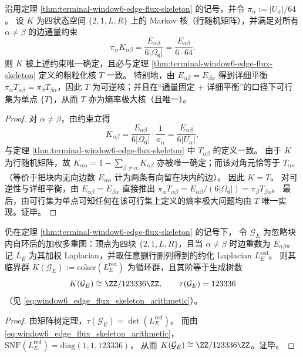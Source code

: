 \begin{corollary}\label{cor:window6-edge-flux-max-entropy-kernel-uniqueness}
沿用定理 \ref{thm:terminal-window6-edge-flux-skeleton} 的记号，并令 \(\pi_\alpha:=|U_\alpha|/64\)。
设 \(K\) 为四状态空间 \(\{2,1,L,R\}\) 上的 Markov 核（行随机矩阵），并满足对所有 \(\alpha\neq\beta\) 的边通量约束
\[
\pi_\alpha K_{\alpha\beta}=\frac{E_{\alpha\beta}}{6|\Omega_6|}=\frac{E_{\alpha\beta}}{6\cdot 64}.
\]
则 \(K\) 被上述约束唯一确定，且必与定理 \ref{thm:terminal-window6-edge-flux-skeleton} 定义的粗粒化核 \(T\) 一致。
特别地，由 \(E_{\alpha\beta}=E_{\beta\alpha}\) 得到详细平衡
\(
\pi_\alpha T_{\alpha\beta}=\pi_\beta T_{\beta\alpha}
\)，因此 \(T\) 为可逆核；并且在“通量固定 + 详细平衡”的口径下可行集为单点 \(\{T\}\)，从而 \(T\) 亦为熵率极大核（且唯一）。
\end{corollary}
\begin{proof}
对 \(\alpha\neq\beta\)，由约束立得
\[
K_{\alpha\beta}=\frac{E_{\alpha\beta}}{6|\Omega_6|}\cdot\frac{1}{\pi_\alpha}
=\frac{E_{\alpha\beta}}{6|U_\alpha|},
\]
与定理 \ref{thm:terminal-window6-edge-flux-skeleton} 中 \(T_{\alpha\beta}\) 的定义一致。
由于 \(K\) 为行随机矩阵，故
\(
K_{\alpha\alpha}=1-\sum_{\beta\neq\alpha}K_{\alpha\beta}
\)
亦被唯一确定；而该对角元恰等于 \(T_{\alpha\alpha}\)（等价于把块内无向边数 \(E_{\alpha\alpha}\) 计为两条有向留在块内的边）。
因此 \(K=T\)。
对可逆性与详细平衡，由 \(E_{\alpha\beta}=E_{\beta\alpha}\) 直接推出
\(
\pi_\alpha T_{\alpha\beta}=E_{\alpha\beta}/(6|\Omega_6|)=\pi_\beta T_{\beta\alpha}
\)。
最后，由可行集为单点可知任何在该可行集上定义的熵率极大问题均由 \(T\) 唯一实现。证毕。
\end{proof}

\begin{corollary}\label{cor:window6-edge-flux-critical-group-cyclic}
仍在定理 \ref{thm:terminal-window6-edge-flux-skeleton} 的记号下，
令 \(\mathcal{G}_E\) 为忽略块内自环后的加权多重图：顶点为四块 \(\{2,1,L,R\}\)，且当 \(\alpha\neq\beta\) 时边重数为 \(E_{\alpha\beta}\)。
记 \(L_E\) 为其加权 Laplacian，并取任意删行删列得到的约化 Laplacian \(L_E^{\mathrm{red}}\)。
则其临界群
\(
K(\mathcal{G}_E):=\mathrm{coker}(L_E^{\mathrm{red}})
\)
为循环群，且其阶等于生成树数
\[
K(\mathcal{G}_E)\cong \ZZ/123336\ZZ,
\qquad
\tau(\mathcal{G}_E)=123336
\]
（见 \eqref{eq:window6_edge_flux_skeleton_arithmetic}）。
\end{corollary}
\begin{proof}
由矩阵树定理，\(\tau(\mathcal{G}_E)=\det(L_E^{\mathrm{red}})\)。
而由 \eqref{eq:window6_edge_flux_skeleton_arithmetic}，
\(\mathrm{SNF}(L_E^{\mathrm{red}})=\mathrm{diag}(1,1,123336)\)，
从而 \(K(\mathcal{G}_E)\cong \ZZ/123336\ZZ\)。证毕。
\end{proof}

